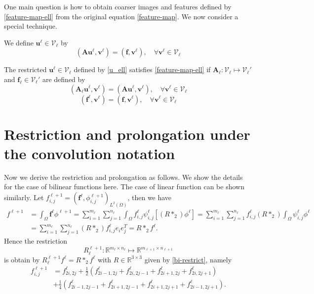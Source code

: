 One main question is how to obtain coarser images and features defined by \eqref{feature-map-ell} from the original equation \eqref{feature-map}.  We now consider a special technique.

We define $\mathbf u^\ell\in \mathcal V_\ell$ by
\begin{equation}
  \label{u_ell}
(\mathbf A\mathbf u^\ell,\mathbf v^\ell)=  (\mathbf f,\mathbf v^\ell), \quad\forall \mathbf v^\ell\in\mathcal V_\ell
\end{equation}
\begin{lemma}
The restricted $\mathbf u^\ell\in\mathcal V_\ell$ defined by \eqref{u_ell} satisfies \eqref{feature-map-ell} if 
$\mathbf A_\ell: \mathcal V_\ell\mapsto \mathcal V_\ell'$ and $\mathbf f_\ell\in \mathcal V_\ell'$ are defined by
\begin{equation}
  \label{A-ell}
(\mathbf A_\ell \mathbf u^\ell,\mathbf v^\ell)=  (\mathbf A\mathbf u^\ell,\mathbf v^\ell), \quad\forall \mathbf v^\ell\in\mathcal V_\ell
\end{equation}
\begin{equation}
  \label{u-ell}
(\mathbf f^\ell,\mathbf v^\ell)=  (\mathbf f,\mathbf v^\ell), \quad\forall \mathbf v^\ell\in\mathcal V_\ell
\end{equation}
\end{lemma}


\section{Restriction and prolongation under the convolution notation}
Now we derive the restriction and prolongation as follows. We show the details for the case of bilinear functions here. The 
case of linear function can be shown similarly. 
Let $f_{i,j}^{\ell+1}=(\mathbf f^\ell,\phi^{\ell+1}_{i,j})_{L^2(\Omega)}$, then we have
\begin{equation}
\begin{split}
  f^{\ell+1}&=\int_{\Omega} \mathbf f^\ell \phi^{\ell+1}=\sum\limits_{i=1}^{m_\ell}\sum\limits_{j=1}^{n_\ell}
 \int_{\Omega}f_{i,j}^{\ell}\psi_{i,j}^\ell\left[(R\ast_2) \phi^\ell\right]
=\sum\limits_{i=1}^{m_\ell}\sum\limits_{j=1}^{n_\ell} f_{i,j}^{\ell}(R\ast_2)\int_{\Omega}\psi_{i,j}^\ell \phi^\ell\\
&=\sum\limits_{i=1}^{m_\ell}\sum\limits_{j=1}^{n_\ell}(R\ast_2)f_{i,j}^{\ell}e_ie_j^T=R\ast_2 f^{\ell}.
\end{split}
\end{equation}
Hence the restriction 
$$
R^{\ell+1}_\ell: \mathbb R^{m_{\ell}\times n_{\ell}}\mapsto  \mathbb R^{m_{\ell+1}\times n_{\ell+1}} 
$$
is obtain by $R^{\ell+1}_\ell  f^{\ell}= R\ast_2  f^{\ell}$ with $R\in \mathbb R^{3\times 3}$ given by  \eqref{bi-restrict}, namely
\begin{equation}\label{restriction:freedom}
\begin{split}
f_{i,j}^{\ell+1}&=f^{\ell}_{2i,2j}+\frac{1}{2}(f^{\ell}_{2i-1,2j}+f^{\ell}_{2i,2j-1}+f^{\ell}_{2i+1,2j}+f^{\ell}_{2i,2j+1})\\
&+\frac{1}{4}\left(f^{\ell}_{2i-1,2j-1}+f^{\ell}_{2i+1,2j-1}+f^{\ell}_{2i+1,2j+1}+f^{\ell}_{2i-1,2j+1}\right).
\end{split}
\end{equation}

